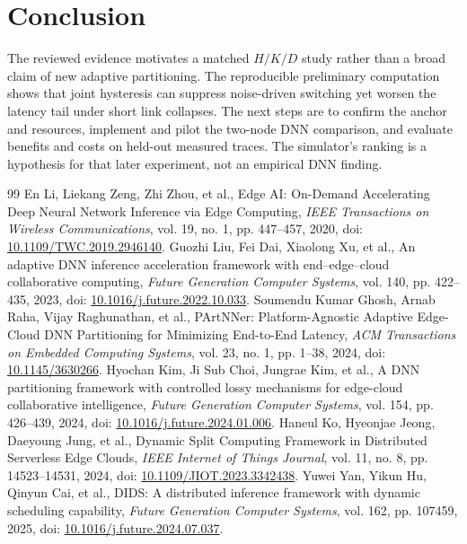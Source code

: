 \documentclass[10pt,a4paper,twocolumn]{article}
\begin{document}
\section{Conclusion}
The reviewed evidence motivates a matched $H/K/D$ study rather than a broad claim of new adaptive partitioning. The reproducible preliminary computation shows that joint hysteresis can suppress noise-driven switching yet worsen the latency tail under short link collapses. The next steps are to confirm the anchor and resources, implement and pilot the two-node DNN comparison, and evaluate benefits and costs on held-out measured traces. The simulator's ranking is a hypothesis for that later experiment, not an empirical DNN finding.

\begin{thebibliography}{99}
 En Li, Liekang Zeng, Zhi Zhou, et al., Edge AI: On-Demand Accelerating Deep Neural Network Inference via Edge Computing, \emph{IEEE Transactions on Wireless Communications}, vol. 19, no. 1, pp. 447--457, 2020, doi: \href{https://doi.org/10.1109/TWC.2019.2946140}{10.1109/TWC.2019.2946140}.
 Guozhi Liu, Fei Dai, Xiaolong Xu, et al., An adaptive DNN inference acceleration framework with end–edge–cloud collaborative computing, \emph{Future Generation Computer Systems}, vol. 140, pp. 422--435, 2023, doi: \href{https://doi.org/10.1016/j.future.2022.10.033}{10.1016/j.future.2022.10.033}.
 Soumendu Kumar Ghosh, Arnab Raha, Vijay Raghunathan, et al., PArtNNer: Platform-Agnostic Adaptive Edge-Cloud DNN Partitioning for Minimizing End-to-End Latency, \emph{ACM Transactions on Embedded Computing Systems}, vol. 23, no. 1, pp. 1--38, 2024, doi: \href{https://doi.org/10.1145/3630266}{10.1145/3630266}.
 Hyochan Kim, Ji Sub Choi, Jungrae Kim, et al., A DNN partitioning framework with controlled lossy mechanisms for edge-cloud collaborative intelligence, \emph{Future Generation Computer Systems}, vol. 154, pp. 426--439, 2024, doi: \href{https://doi.org/10.1016/j.future.2024.01.006}{10.1016/j.future.2024.01.006}.
 Haneul Ko, Hyeonjae Jeong, Daeyoung Jung, et al., Dynamic Split Computing Framework in Distributed Serverless Edge Clouds, \emph{IEEE Internet of Things Journal}, vol. 11, no. 8, pp. 14523--14531, 2024, doi: \href{https://doi.org/10.1109/JIOT.2023.3342438}{10.1109/JIOT.2023.3342438}.
 Yuwei Yan, Yikun Hu, Qinyun Cai, et al., DIDS: A distributed inference framework with dynamic scheduling capability, \emph{Future Generation Computer Systems}, vol. 162, pp. 107459, 2025, doi: \href{https://doi.org/10.1016/j.future.2024.07.037}{10.1016/j.future.2024.07.037}.

\end{thebibliography}
\end{document}
